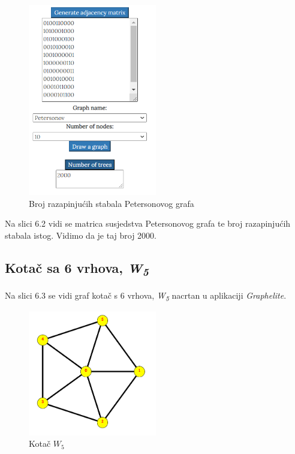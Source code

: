 \documentclass[times, utf8, zavrsni]{fer}
\begin{document}
\begin{figure}[htb]
	\centering
	\includegraphics[width=0.5\textwidth]{slike/petersonovbroj.png}
	\caption{Broj razapinjućih stabala Petersonovog grafa}
	\label{fig:petersonov-broj}
\end{figure}

Na slici 6.2 vidi se matrica susjedstva Petersonovog grafa te broj razapinjućih stabala istog. Vidimo da je taj broj 2000.

\subsection{Kotač sa 6 vrhova, \textit{W\textsubscript{5}}}

Na slici 6.3 se vidi graf kotač s 6 vrhova, \textit{W\textsubscript{5}} nacrtan u aplikaciji \textit{Graphelite}.

\begin{figure}[htb]
	\centering
	\includegraphics[width=0.5\textwidth]{slike/kotac2.png}
	\caption{Kotač $W_5$}
	\label{fig:kotac}
\end{figure}
\end{document}
